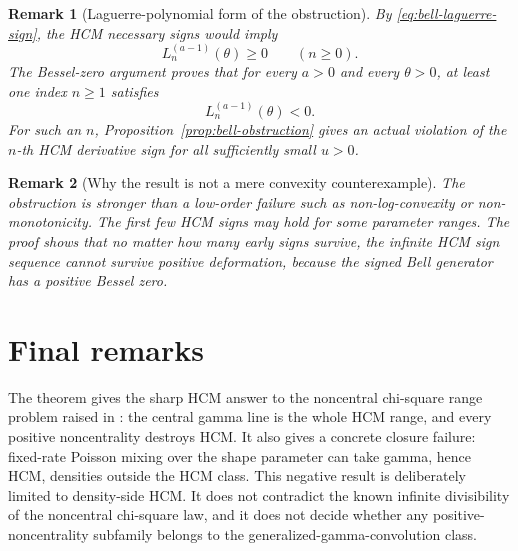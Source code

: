 ﻿\documentclass[preprint,12pt,authoryear]{elsarticle}
\newtheorem{remark}{Remark}
\begin{document}
\begin{remark}[Laguerre-polynomial form of the obstruction]
By \eqref{eq:bell-laguerre-sign}, the HCM necessary signs would imply
\begin{equation}
L_n^{(a-1)}(\theta)\ge0
\qquad(n\ge0).
\end{equation}
The Bessel-zero argument proves that for every \(a>0\) and every \(\theta>0\), at least one index \(n\ge1\) satisfies
\begin{equation}
L_n^{(a-1)}(\theta)<0.
\end{equation}
For such an \(n\), Proposition~\ref{prop:bell-obstruction} gives an actual violation of the \(n\)-th HCM derivative sign for all sufficiently small \(u>0\).
\end{remark}

\begin{remark}[Why the result is not a mere convexity counterexample]
The obstruction is stronger than a low-order failure such as non-log-convexity or non-monotonicity.  The first few HCM signs may hold for some parameter ranges.  The proof shows that no matter how many early signs survive, the infinite HCM sign sequence cannot survive positive deformation, because the signed Bell generator has a positive Bessel zero.
\end{remark}

\section{Final remarks}

The theorem gives the sharp HCM answer to the noncentral chi-square range problem raised in \cite[Section~4.2]{BariczPrabhuSinghVijesh2026}: the central gamma line is the whole HCM range, and every positive noncentrality destroys HCM.  It also gives a concrete closure failure: fixed-rate Poisson mixing over the shape parameter can take gamma, hence HCM, densities outside the HCM class.  This negative result is deliberately limited to density-side HCM.  It does not contradict the known infinite divisibility of the noncentral chi-square law, and it does not decide whether any positive-noncentrality subfamily belongs to the generalized-gamma-convolution class.
\end{document}

